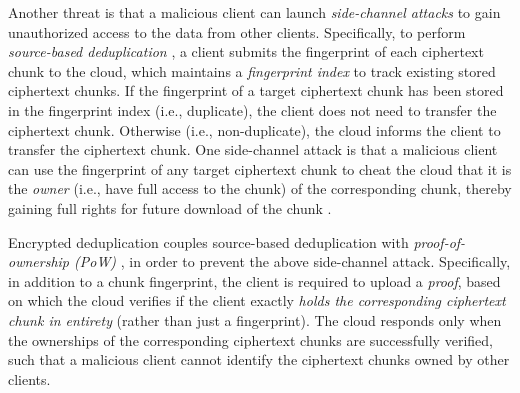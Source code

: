 Another threat is that a malicious client  can launch {\em side-channel attacks} \cite{harnik10, halevi11} to gain unauthorized access to the data from other clients. Specifically, to perform {\em source-based deduplication} \cite{harnik10}, a client submits the fingerprint of each ciphertext chunk to the cloud, which  maintains a {\em fingerprint index} to track existing stored ciphertext chunks. If the fingerprint of a target ciphertext chunk has been stored in the fingerprint index (i.e., duplicate), the client does not need to transfer the ciphertext chunk.
Otherwise (i.e., non-duplicate),
the cloud informs the client to transfer the ciphertext chunk.
One side-channel attack \cite{mulazzani11, halevi11} is that
a malicious client can use the fingerprint of any target ciphertext chunk to cheat the cloud that it is the {\em owner} (i.e., have full access to the chunk) of the corresponding chunk, thereby gaining full rights for future download of the chunk \cite{mulazzani11}.




Encrypted deduplication couples source-based deduplication with {\em proof-of-ownership (PoW)} \cite{halevi11}, in order to prevent the above side-channel attack. Specifically, in addition to a chunk fingerprint, the client is required to upload a {\em proof}, based on which the cloud verifies if the client exactly {\em holds the corresponding ciphertext chunk in entirety} (rather than just a fingerprint). The cloud responds only when the ownerships of the corresponding ciphertext chunks are successfully verified, such that a malicious client cannot identify the ciphertext chunks owned by other clients.



